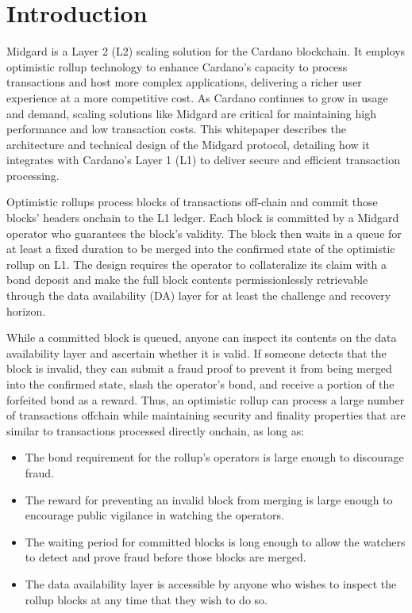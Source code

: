 \documentclass[../midgard.tex]{subfiles}
\begin{document}
\section*{Introduction}
\label{h:introduction}

Midgard is a Layer 2 (L2) scaling solution for the Cardano blockchain.
It employs optimistic rollup technology to enhance Cardano's capacity to process transactions and host more complex applications, delivering a richer user experience at a more competitive cost.
As Cardano continues to grow in usage and demand, scaling solutions like Midgard are critical for maintaining high performance and low transaction costs.
This whitepaper describes the architecture and technical design of the Midgard protocol, detailing how it integrates with Cardano's Layer 1 (L1) to deliver secure and efficient transaction processing.

Optimistic rollups process blocks of transactions off-chain and commit those blocks' headers onchain to the L1 ledger.
Each block is committed by a Midgard operator who guarantees the block's validity.
The block then waits in a queue for at least a fixed duration to be merged into the confirmed state of the optimistic rollup on L1.
The design requires the operator to collateralize its claim with a bond deposit and make the full block contents permissionlessly retrievable through the data availability (DA) layer for at least the challenge and recovery horizon.

While a committed block is queued, anyone can inspect its contents on the data availability layer and ascertain whether it is valid.
If someone detects that the block is invalid, they can submit a fraud proof to prevent it from being merged into the confirmed state, slash the operator's bond, and receive a portion of the forfeited bond as a reward.
Thus, an optimistic rollup can process a large number of transactions offchain while maintaining security and finality properties that are similar to transactions processed directly onchain, as long as:
\begin{itemize}
    \item The bond requirement for the rollup's operators is large enough to discourage fraud.
    \item The reward for preventing an invalid block from merging is large enough to encourage public vigilance in watching the operators.
    \item The waiting period for committed blocks is long enough to allow the watchers to detect and prove fraud before those blocks are merged.
    \item The data availability layer is accessible by anyone who wishes to inspect the rollup blocks at any time that they wish to do so.
\end{itemize}
\end{document}
